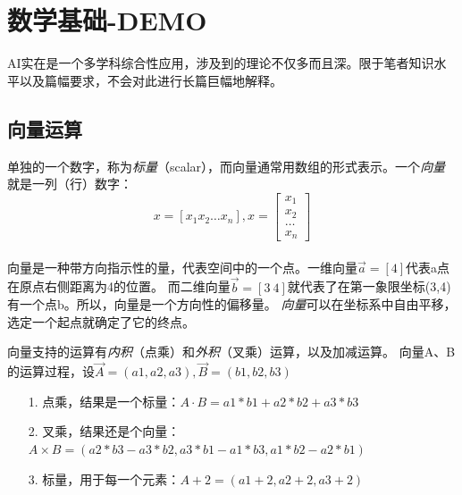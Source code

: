 \chapter{数学基础-DEMO}
\label{chap:math_regression}

\gls{AI}实在是一个多学科综合性应用，涉及到的理论不仅多而且深。限于笔者知识水平以及篇幅要求，不会对此进行长篇巨幅地解释。


\section{向量运算}
单独的一个数字，称为\emph{标量}（scalar），而向量通常用数组的形式表示。一个\emph{向量}就是一列（行）数字：
\begin{equation}
x=[x_1 x_2 \dots x_n],
x=\left[\begin{array}{c} x_1\\x_2\\\dots\\x_n\end{array}\right]
\label{part2_vector_form}
\end{equation}
\ \\
向量是一种带方向指示性的量，代表空间中的一个点。一维向量$\vec{a}=\left[4\right]$代表a点在原点右侧距离为4的位置。
而二维向量$\vec{b}=\left[3\ 4\right]$就代表了在第一象限坐标(3,4)有一个点b。所以，向量是一个方向性的偏移量。
\emph{向量}可以在坐标系中自由平移，选定一个起点就确定了它的终点。

\begin{center} \end{center} 

向量支持的运算有\emph{内积}（点乘）和\emph{外积}（叉乘）运算，以及加减运算。
向量A、B的运算过程，设$\vec{A} = (a1,  a2,  a3), \vec{B} = (b1,  b2,  b3)$

\begin{itemize}
\item[1.] 点乘，结果是一个标量：$A \cdot B = a1*b1 + a2*b2 + a3*b3$
\item[2.] 叉乘，结果还是个向量：$A \times B = (a2*b3 - a3*b2, a3*b1 - a1*b3, a1*b2 - a2*b1)$
\item[3.] 标量，用于每一个元素：$A + 2 = (a1+2, a2+2, a3+2)$
\end{itemize}

